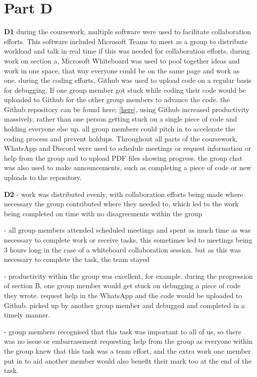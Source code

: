 \section{Part D}%
\label{closedloopy}

\textbf{D1} during the coursework, multiple software were used to facilitate collaboration efforts. 
This software included Microsoft Teams to meet as a group to distribute workload and talk in real time if this was needed for collaboration efforts, during work on section a, Microsoft Whiteboard was used to pool together ideas and work in one space, that way everyone could be on the same page and work as one. during the coding efforts, Github was used to
upload code on a regular basis for debugging. If one group member got stuck while coding
their code would be uploaded to Github for the other group members to advance the code.
the Github repository can be found here; \href{https://github.com/ELE2024-Controls/Coursework}{[here]}, using Github increased productivity
massively, rather than one person getting stuck on a single piece of code and holding 
everyone else up. all group members could pitch in to accelerate the coding process
and prevent holdups. Throughout all parts of the coursework, WhatsApp and Discord were
used to schedule meetings or request information or help from the group and to upload PDF
files showing progress. the group chat was also used to make announcements, such as 
completing a piece of code or new uploads to the repository.

\textbf{D2} - work was distributed evenly, with collaboration efforts being made where necessary
     the group contributed where they needed to, which led to the work being completed
     on time with no disagreements within the group
   
   - all group members attended scheduled meetings and spent as much time as was necessary 
     to complete work or receive tasks, this sometimes led to meetings being 3 hours long
     in the case of a whiteboard collaboration session. but as this was necessary to 
     complete the task, the team stayed
   
   - productivity within the group was excellent, for example. during the progression of 
     section B, one group member would get stuck on debugging a piece of code they wrote.
     request help in the WhatsApp and the code would be uploaded to Github. picked up by 
     another group member and debugged and completed in a timely manner.

   - group members recognised that this task was important to all of us, so there was no
     issue or embarrassment requesting help from the group as everyone within the group 
     knew that this task was a team effort, and the extra work one member put in to aid 
     another member would also benefit their mark too at the end of the task. 

